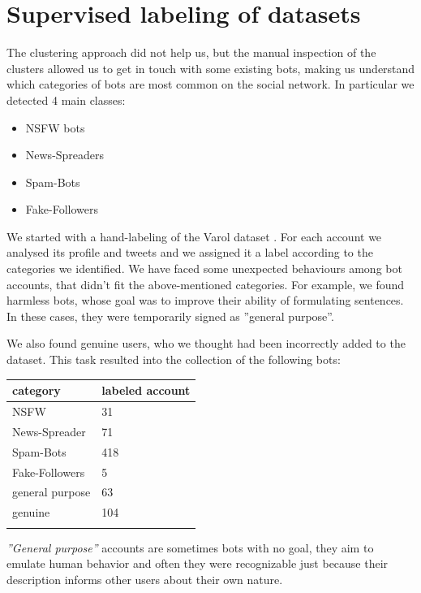 \section{Supervised labeling of datasets}
The clustering approach did not help us, but the manual inspection of the clusters allowed us to get in touch with some existing bots, making us understand which categories of bots are most common on the social network. In particular we detected 4 main classes:
\begin{itemize}
	\item[\PencilRight]NSFW bots
	\item[\PencilRight]News-Spreaders
	\item[\PencilRight]Spam-Bots
	\item[\PencilRight]Fake-Followers
\end{itemize}

We started with a hand-labeling of the Varol dataset \cite{Varol}. For each account we analysed its profile and tweets and we assigned it a label according to the categories we identified.  We have faced some unexpected behaviours among bot accounts, that didn't fit the above-mentioned categories. For example, we found harmless bots, whose goal was to improve their ability of formulating sentences. In these cases, they were temporarily signed as ''general purpose''.

We also found genuine users, who we thought  had been incorrectly added to the dataset.
This task resulted into the collection of the following bots:

\begin{center}
	\begin{tabular}{ll}
		\\category&labeled account\\
		\hline\hline
		NSFW&31\\
		News-Spreader&71\\
		Spam-Bots&418\\
		Fake-Followers&5\\
		general purpose&63\\
		genuine&104\\\hline\\		
	\end{tabular}
\end{center}

\emph{''General purpose''} accounts are sometimes bots with no goal, they aim to emulate human behavior and often they were recognizable just because their description informs other users about their own nature.


